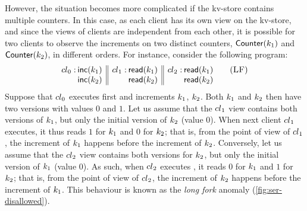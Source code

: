 However, the situation becomes more complicated if the kv-store contains multiple counters. 
In this case, as each client has its own view on the kv-store, and since the views 
of clients are independent from each other, it is possible for two 
clients to observe the increments on two distinct counters, $\mathsf{Counter}(k_1)$ and $\mathsf{Counter}(k_2)$, in different orders. 
For instance, consider the following program:
\begin{align}
	\begin{array}[t]{@{} r @{\hspace{2pt}} l || r @{\hspace{2pt}} l || r @{\hspace{2pt}} l @{}}
		\cl_0: 
		& \ctrinc(\ke_1) 
		& \cl_1: 
		& \ctrread(\ke_1)
		& \cl_2: 
		& \ctrread(\ke_1)\\
%
		& \ctrinc(\ke_2) 
		&& \ctrread(\ke_2)
		&& \ctrread(\ke_2)
	\end{array}
	\tag{\textsc{LF}}
	\label{prog:LF}
\end{align}
Suppose that ${cl}_0$ executes first and increments $k_1$, $k_2$. 
Both $k_1$ and $k_2$ then have two versions with values $0$ and $1$. 
Let us assume that the ${cl}_1$ view contains both versions of $k_1$, but only 
the initial version of $k_2$ (value $0$). 
When next client ${cl}_1$ executes, it thus reads $1$ for $k_1$ and $0$ for $k_2$; 
that is, from the point of view of ${cl}_1$, the increment of $k_1$ 
happens before the increment of $k_2$. 
Conversely, let us assume that the ${cl}_2$ view contains both versions for $k_2$, but only 
the initial version of $k_1$ (value $0$). 
As such, when ${cl}_2$ executes , it reads $0$ for $k_1$ and $1$ for $k_2$;
that is, from the point of view of ${cl}_2$, the increment of $k_2$ 
happens before the increment of $k_1$. 
This behaviour is known as the \emph{long fork} anomaly (\cref{fig:ser-disallowed}). 


